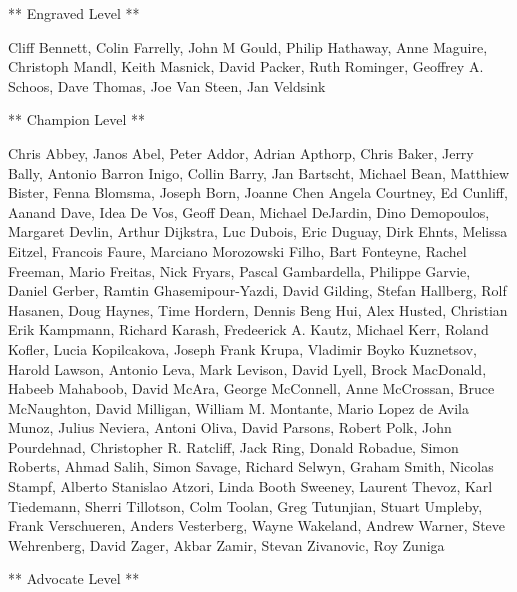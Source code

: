 \documentclass[]{memoir}
\begin{document}
** Engraved Level **

Cliff Bennett, Colin Farrelly, John M Gould, Philip Hathaway, Anne
Maguire, Christoph Mandl, Keith Masnick, David Packer, Ruth Rominger,
Geoffrey A. Schoos, Dave Thomas, Joe Van Steen, Jan Veldsink

** Champion Level **

Chris Abbey, Janos Abel, Peter Addor, Adrian Apthorp, Chris Baker, Jerry
Bally, Antonio Barron Inigo, Collin Barry, Jan Bartscht, Michael Bean,
Matthiew Bister, Fenna Blomsma, Joseph Born, Joanne Chen Angela
Courtney, Ed Cunliff, Aanand Dave, Idea De Vos, Geoff Dean, Michael
DeJardin, Dino Demopoulos, Margaret Devlin, Arthur Dijkstra, Luc Dubois,
Eric Duguay, Dirk Ehnts, Melissa Eitzel, Francois Faure, Marciano
Morozowski Filho, Bart Fonteyne, Rachel Freeman, Mario Freitas, Nick
Fryars, Pascal Gambardella, Philippe Garvie, Daniel Gerber, Ramtin
Ghasemipour-Yazdi, David Gilding, Stefan Hallberg, Rolf Hasanen, Doug
Haynes, Time Hordern, Dennis Beng Hui, Alex Husted, Christian Erik
Kampmann, Richard Karash, Fredeerick A. Kautz, Michael Kerr, Roland
Kofler, Lucia Kopilcakova, Joseph Frank Krupa, Vladimir Boyko Kuznetsov,
Harold Lawson, Antonio Leva, Mark Levison, David Lyell, Brock MacDonald,
Habeeb Mahaboob, David McAra, George McConnell, Anne McCrossan, Bruce
McNaughton, David Milligan, William M. Montante, Mario Lopez de Avila
Munoz, Julius Neviera, Antoni Oliva, David Parsons, Robert Polk, John
Pourdehnad, Christopher R. Ratcliff, Jack Ring, Donald Robadue, Simon
Roberts, Ahmad Salih, Simon Savage, Richard Selwyn, Graham Smith,
Nicolas Stampf, Alberto Stanislao Atzori, Linda Booth Sweeney, Laurent
Thevoz, Karl Tiedemann, Sherri Tillotson, Colm Toolan, Greg Tutunjian,
Stuart Umpleby, Frank Verschueren, Anders Vesterberg, Wayne Wakeland,
Andrew Warner, Steve Wehrenberg, David Zager, Akbar Zamir, Stevan
Zivanovic, Roy Zuniga

** Advocate Level **
\end{document}
